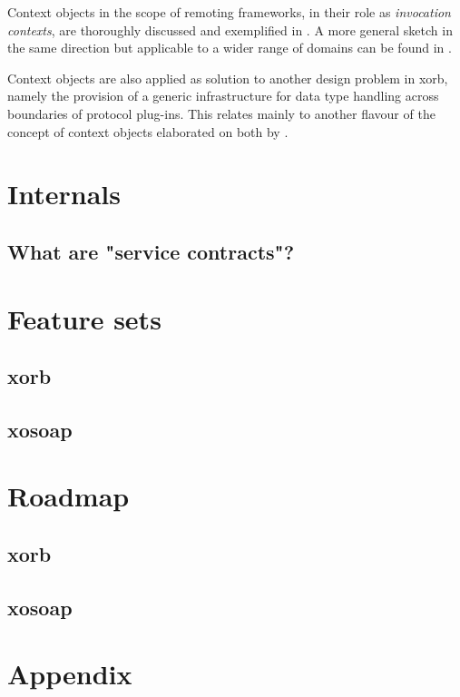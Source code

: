 Context objects in the scope of remoting frameworks, in their role as \emph{invocation contexts}, are thoroughly discussed and exemplified in \cite{zdun:2005}. A more general sketch in the same direction but applicable to a wider range of domains can be found in \cite{kelly:2003}.

Context objects are also applied as solution to another design problem in xorb, namely the provision of a generic infrastructure for data type handling across boundaries of protocol plug-ins. This relates mainly to another flavour of the concept of context objects elaborated on both by \cite{maetzel:1996,sommerlad:1998}. 
  \section{Internals}\label{sec:internal}
  \subsection{What are "service contracts"?}\label{sec:internal:contracts}
  \section{Feature sets}
  \subsection{xorb}
  \subsection{xosoap}
  \section{Roadmap}
   \subsection{xorb}	
  \subsection{xosoap}
  \section{Appendix} 

